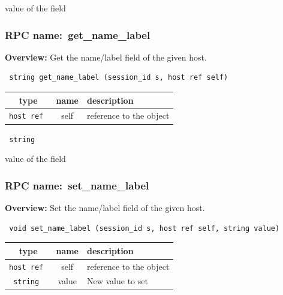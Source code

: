 value of the field
\vspace{0.3cm}
\vspace{0.3cm}
\vspace{0.3cm}
\subsubsection{RPC name:~get\_name\_label}

{\bf Overview:} 
Get the name/label field of the given host.

\begin{verbatim} string get_name_label (session_id s, host ref self)\end{verbatim}



 
\vspace{0.3cm}
\begin{tabular}{|c|c|p{7cm}|}
 \hline
{\bf type} & {\bf name} & {\bf description} \\ \hline
{\tt host ref } & self & reference to the object \\ \hline 

\end{tabular}

\vspace{0.3cm}

{\tt 
string
}


value of the field
\vspace{0.3cm}
\vspace{0.3cm}
\vspace{0.3cm}
\subsubsection{RPC name:~set\_name\_label}

{\bf Overview:} 
Set the name/label field of the given host.

\begin{verbatim} void set_name_label (session_id s, host ref self, string value)\end{verbatim}



 
\vspace{0.3cm}
\begin{tabular}{|c|c|p{7cm}|}
 \hline
{\bf type} & {\bf name} & {\bf description} \\ \hline
{\tt host ref } & self & reference to the object \\ \hline 

{\tt string } & value & New value to set \\ \hline 

\end{tabular}

